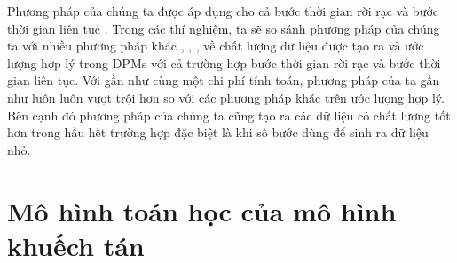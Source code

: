 \documentclass[14pt, a4paper]{article}
\numberwithin{equation}{section}
\numberwithin{figure}{section}
\numberwithin{dl}{section}
\numberwithin{md}{section}
\numberwithin{bd}{section}
\numberwithin{dn}{section}
\numberwithin{hq}{section}
\begin{document}
    Phương pháp của chúng ta được áp dụng cho cả bước thời gian rời rạc \cite{ho2020denoising} và bước thời gian liên tục \cite{song2020score}.
    Trong các thí nghiệm, ta sẽ so sánh phương pháp của chúng ta với nhiều phương pháp khác \cite{ho2020denoising}, \cite{song2020denoising}, \cite{bao2021analytic}, \cite{song2020score} về chất lượng dữ liệu được tạo ra và ước lượng hợp lý trong DPMs với cả trường hợp bước thời gian rời rạc và bước thời gian liên tục.
    Với gần như cùng một chi phí tính toán, phương pháp của ta gần như luôn luôn vượt trội hơn so với các phương pháp khác trên ước lượng hợp lý.
    Bên cạnh đó phương pháp của chúng ta cũng tạo ra các dữ liệu có chất lượng tốt hơn trong hầu hết trường hợp đặc biệt là khi số bước dùng để sinh ra dữ liệu nhỏ.

    \section{Mô hình toán học của mô hình khuếch tán} \label{Background}
\end{document}
